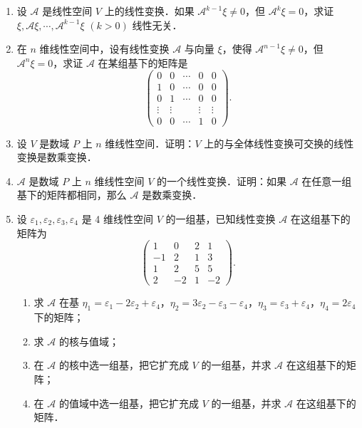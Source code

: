 \begin{enumerate}
\begin{enumerate}
  \anssub
    \item 求 $\mathcal{A}$ 在基 $\varepsilon_1+\varepsilon_2,\varepsilon_2,\varepsilon_3$ 下的矩阵．
  \anssub
  \end{enumerate}
  \item 设 $\mathcal{A}$ 是线性空间 $V$ 上的线性变换．如果 $\mathcal{A}^{k-1}\xi\ne 0$，但 $\mathcal{A}^k\xi=0$，求证 $\xi,\allowbreak \mathcal{A}\xi,\allowbreak \cdots,\allowbreak \mathcal{A}^{k-1}\xi$ $(k>0)$ 线性无关．
  \ansproof
  \item 在 $n$ 维线性空间中，设有线性变换 $\mathcal{A}$ 与向量 $\xi$，使得 $\mathcal{A}^{n-1}\xi\ne 0$，但 $\mathcal{A}^n\xi=0$，求证 $\mathcal{A}$ 在某组基下的矩阵是
  \[
    \begin{pmatrix}
      0&0&\cdots&0&0\\
      1&0&\cdots&0&0\\
      0&1&\cdots&0&0\\
      \vdots&\vdots&&\vdots&\vdots\\
      0&0&\cdots&1&0
    \end{pmatrix}.
  \]
  \ansproof
  \item 设 $V$ 是数域 $P$ 上 $n$ 维线性空间．证明：$V$ 上的与全体线性变换可交换的线性变换是数乘变换．
  \ansproof
  \item $\mathcal{A}$ 是数域 $P$ 上 $n$ 维线性空间 $V$ 的一个线性变换．证明：如果 $\mathcal{A}$ 在任意一组基下的矩阵都相同，那么 $\mathcal{A}$ 是数乘变换．
  \ansproof
  \item 设 $\varepsilon_1,\varepsilon_2,\varepsilon_3,\varepsilon_4$ 是 4 维线性空间 $V$ 的一组基，已知线性变换 $\mathcal{A}$ 在这组基下的矩阵为
  \[
    \begin{pmatrix}
      1&0&2&1\\
      -1&2&1&3\\
      1&2&5&5\\
      2&-2&1&-2
    \end{pmatrix}.
  \]
  \begin{enumerate}
    \item 求 $\mathcal{A}$ 在基 $\eta_1=\varepsilon_1-2\varepsilon_2+\varepsilon_4$，$\eta_2=3\varepsilon_2-\varepsilon_3-\varepsilon_4$，$\eta_3=\varepsilon_3+\varepsilon_4$，$\eta_4=2\varepsilon_4$ 下的矩阵；
  \anssub
    \item 求 $\mathcal{A}$ 的核与值域；
  \anssub
    \item 在 $\mathcal{A}$ 的核中选一组基，把它扩充成 $V$ 的一组基，并求 $\mathcal{A}$ 在这组基下的矩阵；
  \anssub
    \item 在 $\mathcal{A}$ 的值域中选一组基，把它扩充成 $V$ 的一组基，并求 $\mathcal{A}$ 在这组基下的矩阵．

\end{enumerate}
\end{enumerate}
